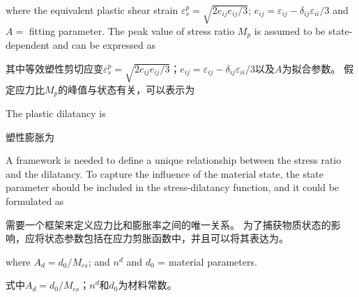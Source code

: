 \begin{ParaColumn}
    \noindent
    where the equivalent plastic shear strain $\varepsilon_{s}^{p}=\sqrt{2 e_{i j} e_{i j} / 3}$; $e_{i j}=\varepsilon_{i j}-\delta_{i j} \varepsilon_{i i}/3$ and $A=$ fitting parameter. The peak value of stress ratio $M_{p}$ is assumed to be state-dependent and can be expressed as \citep{Manzari1997}

    \switchcolumn

    \noindent
    其中等效塑性剪切应变$\varepsilon_{s}^{p}=\sqrt{2 e_{i j} e_{i j} / 3}$；$e_{i j}=\varepsilon_{i j}-\delta_{i j} \varepsilon_{i i}/3$以及$A$为拟合参数。 假定应力比$M_{p}$的峰值与状态有关，可以表示为\citep{Manzari1997}

    \switchcolumn*

    The plastic dilatancy is

    \switchcolumn
    
    塑性膨胀为

    \switchcolumn*

    \noindent
    A framework is needed to define a unique relationship between the stress ratio and the dilatancy. To capture the influence of the material state, the state parameter should be included in the stress-dilatancy function, and it could be formulated as \citep{Li2000,Gajo2001}

    \switchcolumn

    \noindent
    需要一个框架来定义应力比和膨胀率之间的唯一关系。 为了捕获物质状态的影响，应将状态参数包括在应力剪胀函数中，并且可以将其表达为\citep{Li2000,Gajo2001}。

    \switchcolumn*

    \noindent
    where $A_{d}=d_{0} / M_{c s}$; and $n^{d}$ and $d_{0}$ = material parameters.

    \switchcolumn

    \noindent
    式中$A_{d}=d_{0} / M_{c s}$；$n^{d}$和$d_{0}$为材料常数。


\end{ParaColumn}
